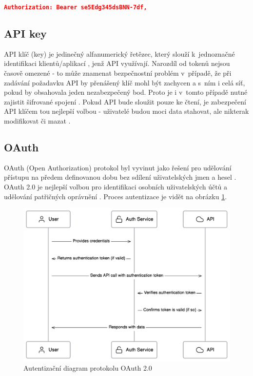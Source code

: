 \documentclass[czech, bc, kiv, he, iso690numb, viewonly]{fasthesis} %
\begin{document}
\begin{lstlisting}[language=json, caption={Autorizační atribut - Bearer schéma}, label=bearerHeader]
	Authorization: Bearer se5Edg345dsBNN-7df,
\end{lstlisting}


\subsection{API key}
API klíč (key) je jedinečný alfanumerický řetězec, který slouží k~jednoznačné identifikaci klientů/aplikací \cite{amazonAPIKey}, jenž API využívají. Narozdíl od tokenů
nejsou časově omezené - to může znamenat bezpečnostní problém v~případě, že při zadávání požadavku API by přenášený klíč mohl být zachycen \cite{mostUsedAuthentication} a s~ním i celá síť, pokud by obsahovala jeden nezabezpečený bod. Proto je i v~tomto případě nutné zajistit šifrované spojení \cite{keepingApiKeysSafe}.
Pokud API bude sloužit pouze ke čtení, je zabezpečení API klíčem tou nejlepší volbou - uživatelé budou moci data stahovat, ale nikterak modifikovat či mazat \cite{mostUsedAuthentication}. 

\subsection{OAuth}
OAuth (Open Authorization) protokol byl vyvinut jako řešení pro udělování přístupu na předem definovanou dobu bez sdílení uživatelských jmen a hesel \cite{understandingOAuth2}. OAuth 2.0
je nejlepší volbou pro identifikaci osobních uživatelských účtů a udělování patřičných oprávnění \cite{mostUsedAuthentication}. Proces autentizace je vidět na obrázku \ref{fig:oauth2Diagram}.

\begin{figure}
	\centering
	\includegraphics[width=1\textwidth]{pictures/oauth2-diagram.png}
	\caption{Autentizační diagram protokolu OAuth 2.0 \cite{oAuthImage}}
	\label{fig:oauth2Diagram}
\end{figure}
\end{document}
